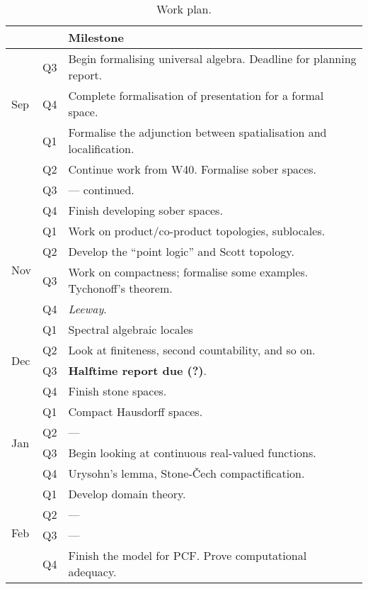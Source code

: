 \documentclass{article}
\begin{document}
\begin{table}[]\caption{Work plan.}\label{table:plan}
\begin{tabular}{lll}
                     &     & Milestone \\\hline \hline
\multirow{3}{*}{Sep} & Q3  & Begin formalising universal algebra. Deadline for planning report. \\
                     & Q4  & Complete formalisation of presentation for a formal space. \\ \hline
\multirow{4}{*}{Oct} & Q1  & Formalise the adjunction between spatialisation and localification. \\
                     & Q2  & Continue work from W40. Formalise sober spaces. \\
                     & Q3  & --- continued. \\
                     & Q4  & Finish developing sober spaces. \\ \hline
\multirow{4}{*}{Nov} & Q1  & Work on product/co-product topologies, sublocales. \\
                     & Q2  & Develop the ``point logic'' and Scott topology. \\
                     & Q3  & Work on compactness; formalise some examples. Tychonoff's theorem. \\
                     & Q4  & \emph{Leeway}. \\ \hline
\multirow{4}{*}{Dec} & Q1  & Spectral algebraic locales \\
                     & Q2  & Look at finiteness, second countability, and so on. \\
                     & Q3  & \textbf{Halftime report due (?)}. \\
                     & Q4  & Finish stone spaces. \\ \hline
\multirow{4}{*}{Jan} & Q1  & Compact Hausdorff spaces. \\
                     & Q2  & --- \\
                     & Q3  & Begin looking at continuous real-valued functions. \\
                     & Q4  & Urysohn's lemma, Stone-\v{C}ech compactification. \\ \hline
\multirow{4}{*}{Feb} & Q1  & Develop domain theory. \\
                     & Q2  & --- \\
                     & Q3  & --- \\
                     & Q4  & Finish the model for PCF. Prove computational adequacy. \\ \hline

\end{tabular}
\end{table}
\end{document}
